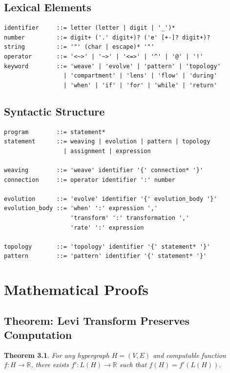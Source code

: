 \documentclass[12pt,a4paper,openany]{book} %
\newtheorem{theorem}{Theorem}[chapter]
\begin{document}
\section{Lexical Elements}

\begin{lstlisting}[style=cpp]
identifier     ::= letter (letter | digit | '_')*
number         ::= digit+ ('.' digit+)? ('e' [+-]? digit+)?
string         ::= '"' (char | escape)* '"'
operator       ::= '<~>' | '~>' | '<=>' | '^' | '@' | '!'
keyword        ::= 'weave' | 'evolve' | 'pattern' | 'topology'
                 | 'compartment' | 'lens' | 'flow' | 'during'
                 | 'when' | 'if' | 'for' | 'while' | 'return'
\end{lstlisting}
\vspace{0.5em}

\section{Syntactic Structure}

\begin{lstlisting}[style=cpp]
program        ::= statement*
statement      ::= weaving | evolution | pattern | topology
                 | assignment | expression

weaving        ::= 'weave' identifier '{' connection* '}'
connection     ::= operator identifier ':' number

evolution      ::= 'evolve' identifier '{' evolution_body '}'
evolution_body ::= 'when' ':' expression ','
                   'transform' ':' transformation ','
                   'rate' ':' expression

topology       ::= 'topology' identifier '{' statement* '}'
pattern        ::= 'pattern' identifier '{' statement* '}'
\end{lstlisting}
\vspace{0.5em}

\chapter{Mathematical Proofs}

\section{Theorem: Levi Transform Preserves Computation}

\begin{theorem}
For any hypergraph $H = (V, E)$ and computable function $f: H \to \mathbb{R}$, there exists $f': L(H) \to \mathbb{R}$ such that $f(H) = f'(L(H))$.
\end{theorem}
\end{document}
